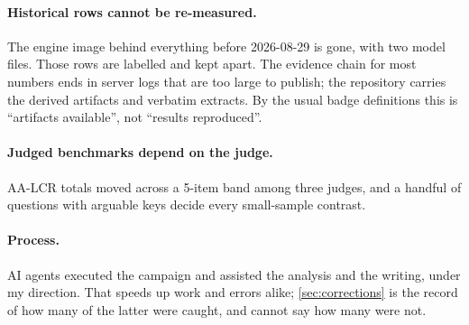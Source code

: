 \paragraph{Historical rows cannot be re-measured.} The engine image behind everything before
2026-08-29 is gone, with two model files. Those rows are labelled and kept apart. The evidence chain
for most numbers ends in server logs that are too large to publish; the repository carries the derived
artifacts and verbatim extracts. By the usual badge definitions this is ``artifacts available'', not
``results reproduced''.

\paragraph{Judged benchmarks depend on the judge.} AA-LCR totals moved across a 5-item band among
three judges, and a handful of questions with arguable keys decide every small-sample contrast.

\paragraph{Process.} AI agents executed the campaign and assisted the analysis and the writing, under
my direction. That speeds up work and errors alike; \cref{sec:corrections} is the record of how many of
the latter were caught, and cannot say how many were not.
